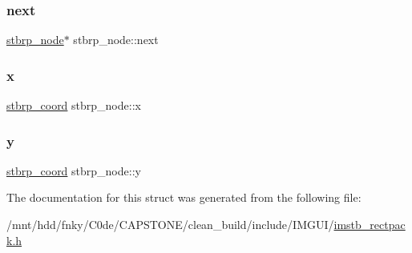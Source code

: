 \subsubsection{\texorpdfstring{next}{next}}
{\footnotesize\ttfamily \hyperlink{structstbrp__node}{stbrp\+\_\+node}$\ast$ stbrp\+\_\+node\+::next}

\mbox{\label{structstbrp__node_a45ab31a88025db27d08040d715b129ea}} 
\subsubsection{\texorpdfstring{x}{x}}
{\footnotesize\ttfamily \hyperlink{imstb__rectpack_8h_a4a396a45893c12de32e2d598abd6b302}{stbrp\+\_\+coord} stbrp\+\_\+node\+::x}

\mbox{\label{structstbrp__node_ad0415cb102a4f37aa45073653307e67e}} 
\subsubsection{\texorpdfstring{y}{y}}
{\footnotesize\ttfamily \hyperlink{imstb__rectpack_8h_a4a396a45893c12de32e2d598abd6b302}{stbrp\+\_\+coord} stbrp\+\_\+node\+::y}



The documentation for this struct was generated from the following file\+:\begin{DoxyCompactItemize}
\item 
/mnt/hdd/fnky/\+C0de/\+C\+A\+P\+S\+T\+O\+N\+E/clean\+\_\+build/include/\+I\+M\+G\+U\+I/\hyperlink{imstb__rectpack_8h}{imstb\+\_\+rectpack.\+h}\end{DoxyCompactItemize}
